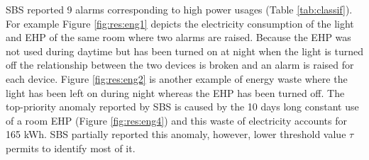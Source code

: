 SBS reported 9 alarms corresponding to high power usages (Table \ref{tab:classif}).
For example Figure \ref{fig:res:eng1} depicts the electricity consumption of the light and EHP of the same room where two alarms are raised.
Because the EHP was not used during daytime but has been turned on at night when the light is turned off the relationship between the two devices is broken and an alarm is raised for each device.
Figure \ref{fig:res:eng2} is another example of energy waste where the light has been left on during night whereas the EHP has been turned off.
The top-priority anomaly reported by SBS is caused by the 10 days long constant use of a room EHP (Figure \ref{fig:res:eng4}) and this waste of electricity accounts for 165 kWh.
SBS partially reported this anomaly, however, lower threshold value $\tau$ permits to identify most of it.

